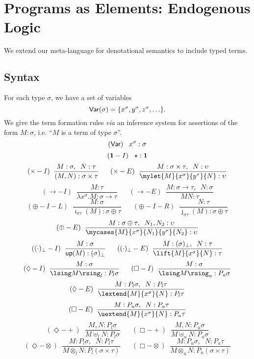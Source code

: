 \section{Programs as Elements: Endogenous Logic}
We extend our meta-language for denotational semantics to include typed
terms.

\subsection*{Syntax}
For each type $\sigma$, we have a set of variables 
\[ {\sf Var}(\sigma ) = \{ x^{\sigma}, y^{\sigma}, z^{\sigma}, \ldots \} . \]
We give the term formation rules {\it via} an inference system for assertions
of the form $M : \sigma$, i.e. ``$M$ is a term of type $\sigma$''.
\[ ({\sf Var}) \;\;\; x^{\sigma} : \sigma \]
\[ ({\bf 1}-I) \;\;\; \star : {\bf 1} \]
\[ ({\times}-I) \;\; \frac{M : \sigma , \;\; N : \tau}{(M, N) : \sigma \times \tau}
\;\;\;\;\;\; 
   ({\times}-E) \;\; \frac{M : \sigma \times \tau , \;\; N : \upsilon}{\mylet{M}{x^{\sigma}}{y^{\tau}}{N} 
 : \upsilon} \]
\[ ({\rightarrow}-I) \;\; \frac{M : \tau}{\lambda x^{\sigma}. M:\sigma \rightarrow \tau} \;\;\;\;\;\;
   ({\rightarrow}-E) \;\; 
\frac{M:\sigma \rightarrow \tau  , \;\; N:\sigma}{MN:\tau} \]
\[ ({\oplus}-I-L) \;\; \frac{M : \sigma}{\imath_{\sigma \tau}(M) : \sigma \oplus \tau}
\;\;\;\;\;\;
   ({\oplus}-I-R) \;\; \frac{N : \tau}{\jmath_{\sigma \tau}(M) : \sigma \oplus \tau} \]
\[ ({\oplus}-E) \;\; \frac{M : \sigma \oplus \tau , \;\; N_{1}, N_{2} : 
\upsilon}{\mycases{M}{x^{\sigma}}{N_{1}}{y^{\tau}}{N_{2}} : \upsilon} \]
\[ ((\cdot )_{\bot}-I) \;\; \frac{M : \sigma}{{\sf up}(M) : (\sigma )_{\bot}}
\;\;\;\;\;\;
   ((\cdot )_{\bot}-E) \;\; \frac{M : (\sigma )_{\bot}, \;\; N : \tau}{\lift{M}{x^{\sigma}}{N} : \tau } \]
\[ ({\Diamond}-I) \;\; \frac{M : \sigma}{\lsing M \rsing_{l} : P_{l} \sigma}
\;\;\;\;\;\;
   ({\Box}-I) \;\; \frac{M:\sigma}{\lsing M \rsing_{u} : P_{u} \sigma} \] 
\[ ({\Diamond}-E) \;\; \frac{M : P_{l} \sigma , \;\; N : P_{l} \tau}{\lextend{M}{x^{\sigma}}{N} : P_{l} \tau} \]
\[ ({\Box}-E) \;\; \frac{M: P_{u} \sigma , \;\; N : P_{u} \tau}{\uextend{M}{x^{\sigma}}{N} : P_{u} \tau} \]
\[ ({\Diamond}-{+}) \;\; \frac{M, N : P_{l} \sigma}{M \uplus_{l} N : P_{l} \sigma}
\;\;\;\;\;\;
   ({\Box}-{+}) \;\; \frac{M, N: P_{u} \sigma}{M \uplus_{u} N : P_{u} \sigma} \] 
\[ ({\Diamond}-{\otimes}) \;\; \frac{M : P_{l} \sigma , \;\; N : P_{l} \tau}{M \otimes_{l} N : P_{l} (\sigma \times \tau )}
\;\;\;\;\;\;
   ({\Box}-{\otimes}) \;\; \frac{M:P_{u}
\sigma , \;\; N:P_{u} \tau}{M \otimes_{u} N:P_{u} (\sigma \times \tau )} \]
